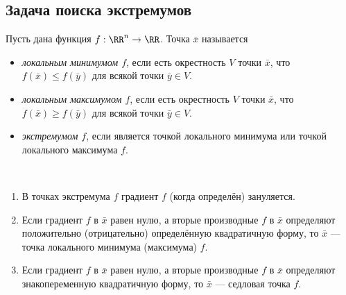 \documentclass[12pt,a4paper]{article}
\begin{document}
    \subsection{Задача поиска экстремумов}

    \begin{definition}
        Пусть дана функция $f: \RR^n \to \RR$. Точка $\bar{x}$ называется
        \begin{itemize}
            \item \emph{локальным минимумом $f$}, если есть окрестность $V$ точки $\bar{x}$, что $f(\bar{x}) \leqslant f(\bar{y})$ для всякой точки $\bar{y} \in V$.
            \item \emph{локальным максимумом $f$}, если есть окрестность $V$ точки $\bar{x}$, что $f(\bar{x}) \geqslant f(\bar{y})$ для всякой точки $\bar{y} \in V$.
            \item \emph{экстремумом $f$}, если является точкой локального минимума или точкой локального максимума $f$.
        \end{itemize}
    \end{definition}

    \begin{lemma}\ 
        \begin{enumerate}
            \item В точках экстремума $f$ градиент $f$ (когда определён) зануляется.
            \item Если градиент $f$ в $\bar{x}$ равен нулю, а вторые производные $f$ в $\bar{x}$ определяют положительно (отрицательно) определённую квадратичную форму, то $\bar{x}$ --- точка локального минимума (максимума) $f$.
            \item Если градиент $f$ в $\bar{x}$ равен нулю, а вторые производные $f$ в $\bar{x}$ определяют знакопеременную квадратичную форму, то $\bar{x}$ --- седловая точка $f$.
        \end{enumerate}
    \end{lemma}
\end{document}
